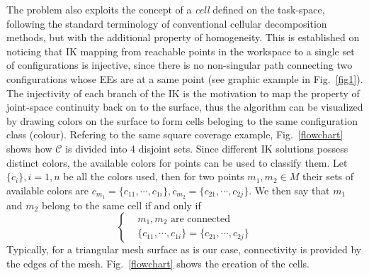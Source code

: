 \documentclass[journal]{IEEEtran}
\begin{document}
The problem also exploits the concept of a \textit{cell} defined on the task-space, following the standard terminology 
of conventional cellular decomposition methods, but with the additional property of homogeneity. 
This is established on noticing that IK mapping from reachable points in the workspace to a single set of configurations is injective, since there is no non-singular path connecting two configurations whose EEs are at a same point 
(see graphic example in Fig.~\ref{fig1}). 
The injectivity of each branch of the IK is the motivation to map the property of joint-space continuity back on to the surface, thus the algorithm can be visualized by drawing colors on the surface to form cells beloging to the same configuration class (colour).  
Refering to the same square coverage example, Fig.~\ref{flowchart} shows how $\mathscr{C}$ is divided into 4 disjoint sets. 
Since different IK solutions possess distinct colors, the available colors for points can be used to classify them. Let $\{c_i\}, i = 1, n$ be all the colors used, then for two points $m_1, m_2\in M$ their sets of available colors are $c_{m_1} = \{c_{11}, \cdots, c_{1i}\}, c_{m_2} = \{c_{21}, \cdots, c_{2j}\}$. We then say that $m_1$ and $m_2$ belong to the same cell if and only if 
$$\left\{
\begin{aligned}
& m_1,m_2 \mbox{ are connected}\\ %
& \{c_{11}, \cdots, c_{1i}\} = \{c_{21}, \cdots, c_{2j}\}
\end{aligned}
\right.
$$
Typically, for a triangular mesh surface as is our case, connectivity is provided by the edges of the mesh. Fig.~\ref{flowchart} shows the creation of the cells. 
\end{document}
